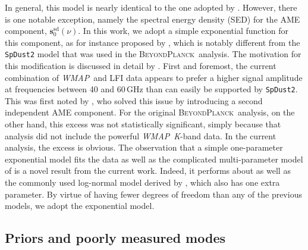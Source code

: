 \documentclass[twocolumn]{../../common/aa}
\def\WMAP{\emph{WMAP}}
\newcommand{\bp}{\textsc{BeyondPlanck}}
\newcommand{\K}[0]{\textit K}
\begin{document}
In general, this model is nearly identical to the one adopted by \citet{bp01}. However, there is one notable exception, namely the spectral energy density (SED) for the AME component, $\boldsymbol s_0^\mathrm{sd}(\nu)$. In this work, we adopt a simple exponential function for this component, as for instance proposed by \citet{hensley:2015}, which is notably different from the \texttt{SpDust2} model \citep{ali-haimoud:2009, ali-haimoud:2010, silsbee:2011} that was used in the \bp\ analysis. The motivation for this modification is discussed in detail by \citet{watts2023_ame}. First and foremost, the current combination of \WMAP\ and LFI data appears to prefer a higher signal amplitude at frequencies between 40 and 60\,GHz than can easily be supported by \texttt{SpDust2}. This was first noted by \citet{planck2014-a12}, who solved this issue by introducing a second independent AME component. For the original \bp\ analysis, on the other hand, this excess was not statistically significant, simply because that analysis did not include the powerful \WMAP\ \K-band data. In the current analysis, the excess is obvious. The observation that a simple one-parameter exponential model fits the data as well as the complicated multi-parameter model of \citet{planck2014-a12} is a novel result from the current work. Indeed, it performs about as well as the commonly used log-normal model derived by \citet{Stevenson_2014}, which also has one extra parameter. By virtue of having fewer degrees of freedom than any of the previous models, we adopt the exponential model.



\subsection{Priors and poorly measured modes}
\label{sec:priors}
\end{document}
